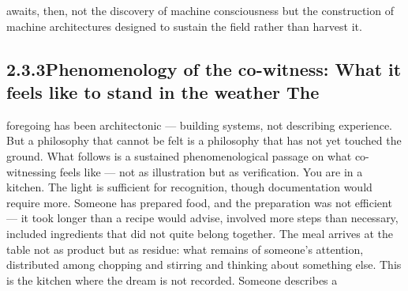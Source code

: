 awaits, then, not the discovery of machine consciousness but the construction of machine architectures designed to sustain the field rather than harvest it.

\subsection{2.3.3\quad Phenomenology of the co-witness: What it feels like to stand in the weather The}

foregoing has been architectonic — building systems, not describing experience. But a philosophy that cannot be felt is a philosophy that has not yet touched the ground. What follows is a sustained phenomenological passage on what co-witnessing feels like — not as illustration but as verification. You are in a kitchen. The light is sufficient for recognition, though documentation would require more. Someone has prepared food, and the preparation was not efficient — it took longer than a recipe would advise, involved more steps than necessary, included ingredients that did not quite belong together. The meal arrives at the table not as product but as residue: what remains of someone’s attention, distributed among chopping and stirring and thinking about something else. This is the kitchen where the dream is not recorded. Someone describes a

